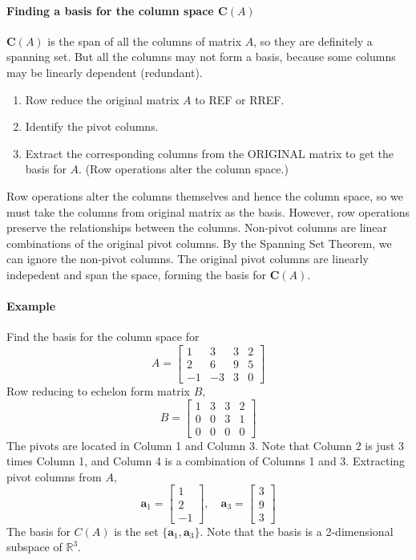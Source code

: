 \documentclass[../linear-algebra.tex]{subfiles}
\begin{document}
\paragraph{Finding a basis for the column space $\mathbf{C}(A)$}
$\mathbf{C}(A)$ is the span of all the columns of matrix $A$, so they are definitely a spanning set.
But all the columns may not form a basis, because some columns may be linearly dependent (redundant).
\begin{enumerate}
    \item Row reduce the original matrix $A$ to REF or RREF.
    \item Identify the pivot columns.
    \item Extract the corresponding columns from the ORIGINAL matrix to get the basis for $A$. (Row operations alter the column space.)
\end{enumerate}
Row operations alter the columns themselves and hence the column space, so we must take the columns from original matrix as the basis.
However, row operations preserve the relationships between the columns. Non-pivot columns are linear combinations of the original pivot columns.
By the Spanning Set Theorem, we can ignore the non-pivot columns. The original pivot columns are linearly indepedent and span the space, forming the basis for $\mathbf{C}(A)$.
\paragraph{Example} Find the basis for the column space for
$$A = \begin{bmatrix} 1 & 3 & 3 & 2 \\ 2 & 6 & 9 & 5 \\ -1 & -3 & 3 & 0 \end{bmatrix}$$
Row reducing to echelon form matrix $B$,
$$B = \begin{bmatrix} 1 & 3 & 3 & 2 \\ 0 & 0 & 3 & 1 \\ 0 & 0 & 0 & 0 \end{bmatrix}$$
The pivots are located in Column 1 and Column 3. Note that Column 2 is just 3 times Column 1, and Column 4 is a combination of Columns 1 and 3.
Extracting pivot columns from $A$,
$$\textbf{a}_{1} = \begin{bmatrix} 1 \\ 2 \\ -1 \end{bmatrix}, \quad \textbf{a}_{3} = \begin{bmatrix} 3 \\ 9 \\ 3 \end{bmatrix}$$
The basis for $C(A)$ is the set $\{\textbf{a}_{1}, \textbf{a}_{3}\}$.
Note that the basis is a 2-dimensional subspace of $\mathbb{R}^3$.
\end{document}
